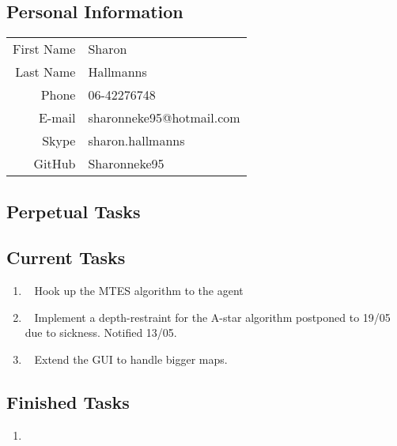 \subsection{Personal Information}
\begin{table}[h!]
	\begin{tabular}{rl}
	    First Name 	& Sharon\\
	    Last Name	& Hallmanns\\
	    Phone		& 06-42276748\\
	    E-mail		& sharonneke95@hotmail.com\\
	    Skype		& sharon.hallmanns\\
	    GitHub		& Sharonneke95\\
    \end{tabular}
\end{table}

\subsection{Perpetual Tasks}

\subsection{Current Tasks}
\begin{enumerate}
	\item~
		Hook up the MTES algorithm to the agent
	\item~
	Implement a depth-restraint for the A-star algorithm
		\subitem postponed to 19/05 due to sickness. Notified 13/05.
	\item~
	Extend the GUI to handle bigger maps.
\end{enumerate}

\subsection{Finished Tasks}
\begin{enumerate}
	\item
\end{enumerate}